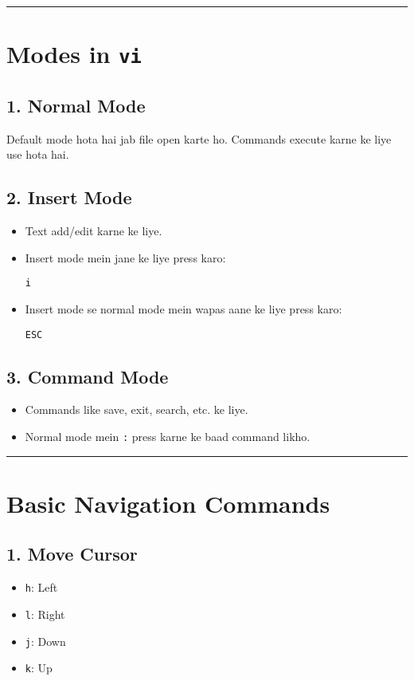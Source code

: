 \documentclass[a4paper,12pt]{article}
\begin{document}
\hrule

\section*{Modes in \texttt{vi}}
\subsection*{1. Normal Mode}
Default mode hota hai jab file open karte ho. Commands execute karne ke liye use hota hai.

\subsection*{2. Insert Mode}
\begin{itemize}
    \item Text add/edit karne ke liye.
    \item Insert mode mein jane ke liye press karo:
\begin{lstlisting}
i
\end{lstlisting}
    \item Insert mode se normal mode mein wapas aane ke liye press karo:
\begin{lstlisting}
ESC
\end{lstlisting}
\end{itemize}

\subsection*{3. Command Mode}
\begin{itemize}
    \item Commands like save, exit, search, etc. ke liye.
    \item Normal mode mein \texttt{:} press karne ke baad command likho.
\end{itemize}

\hrule

\section*{Basic Navigation Commands}
\subsection*{1. Move Cursor}
\begin{itemize}
    \item \texttt{h}: Left
    \item \texttt{l}: Right
    \item \texttt{j}: Down
    \item \texttt{k}: Up
\end{itemize}
\end{document}
